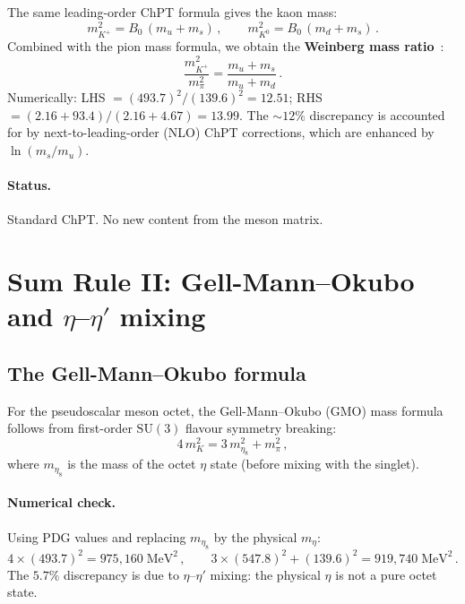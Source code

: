 \documentclass[11pt,a4paper]{article}
\newcommand{\SU}[1]{\mathrm{SU}(#1)}
\theoremstyle{plain}
\begin{document}
The same leading-order ChPT formula gives the kaon mass:
\begin{equation}\label{eq:kaon-mass}
  m_{K^+}^2 = B_0\,(m_u + m_s)\,,\qquad
  m_{K^0}^2 = B_0\,(m_d + m_s)\,.
\end{equation}
Combined with the pion mass formula, we obtain the
\textbf{Weinberg mass ratio}~\cite{Weinberg1977}:
\begin{equation}\label{eq:weinberg-ratio}
  \frac{m_{K^+}^2}{m_\pi^2} = \frac{m_u + m_s}{m_u + m_d}\,.
\end{equation}
Numerically: LHS $= (493.7)^2/(139.6)^2 = 12.51$;
RHS $= (2.16 + 93.4)/(2.16 + 4.67) = 13.99$.  The $\sim 12\%$
discrepancy is accounted for by next-to-leading-order (NLO) ChPT
corrections, which are enhanced by $\ln(m_s/m_u)$.

\paragraph{Status.} Standard ChPT.  No new content from the meson
matrix.


\section{Sum Rule II: Gell-Mann--Okubo and $\eta$--$\eta'$ mixing}
\label{sec:gmo}

\subsection{The Gell-Mann--Okubo formula}

For the pseudoscalar meson octet, the Gell-Mann--Okubo (GMO)
mass formula~\cite{GellMann1961,Okubo1962} follows from first-order
$\SU{3}$ flavour symmetry breaking:
\begin{equation}\label{eq:gmo}
  \boxed{4\,m_K^2 = 3\,m_{\eta_8}^2 + m_\pi^2\,,}
\end{equation}
where $m_{\eta_8}$ is the mass of the octet $\eta$ state (before mixing
with the singlet).

\paragraph{Numerical check.} Using PDG values and replacing
$m_{\eta_8}$ by the physical $m_\eta$:
\begin{equation}
  4 \times (493.7)^2 = 975{,}160\;\text{MeV}^2\,,\qquad
  3 \times (547.8)^2 + (139.6)^2 = 919{,}740\;\text{MeV}^2\,.
\end{equation}
The $5.7\%$ discrepancy is due to $\eta$--$\eta'$ mixing: the physical
$\eta$ is not a pure octet state.
\end{document}
